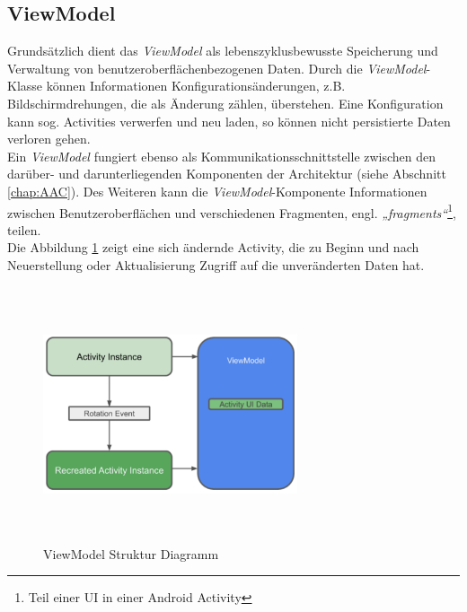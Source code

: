 \subsection*{ViewModel}
\label{sec:ViewModel}
Grundsätzlich dient das \textit{ViewModel} als lebenszyklusbewusste Speicherung und Verwaltung von benutzeroberflächenbezogenen Daten. 
Durch die \textit{ViewModel}-Klasse können Informationen Konfigurationsänderungen, z.B. Bildschirmdrehungen, die als Änderung zählen, 
überstehen. Eine Konfiguration kann sog. Activities verwerfen und neu laden, so können nicht persistierte Daten verloren gehen. 
\\ 
\linebreak
Ein \textit{ViewModel} fungiert ebenso als Kommunikationsschnittstelle zwischen den darüber- und darunterliegenden Komponenten der 
Architektur (siehe Abschnitt \ref{chap:AAC}). Des Weiteren kann die \textit{ViewModel}-Komponente Informationen zwischen Benutzeroberflächen 
und verschiedenen Fragmenten, engl. \textit{„fragments“}\footnote{Teil einer \ac{UI} in einer Android Activity}, teilen.
\\ 
Die Abbildung \ref{pic:viewModeldiagramm} zeigt eine sich ändernde Activity, die zu Beginn und nach Neuerstellung oder Aktualisierung Zugriff 
auf die unveränderten Daten hat. 
\begin{figure}[hbt!]
    \centering
    \includegraphics[width=7.5cm,height=7.5cm,keepaspectratio]{2Grundlagen/Bilder/viewModelDiagram.png}
    \caption{ViewModel Struktur Diagramm \cite{viewmodeldiagr.2020}}
    \label{pic:viewModeldiagramm}
\end{figure} 
